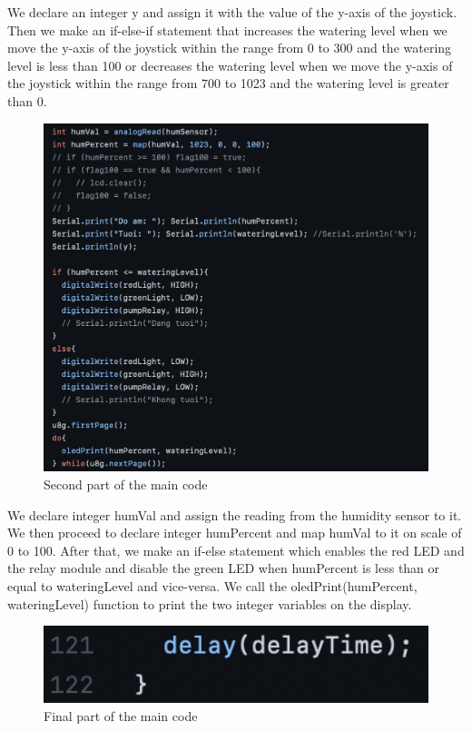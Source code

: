 \documentclass[12pt]{article}
\begin{document}
    We declare an integer y and assign it with the value of the y-axis of the joystick. Then we make an if-else-if statement that increases the watering level when we move the y-axis of the joystick within the range from 0 to 300 and the watering level is less than 100 or decreases the watering level when we move the y-axis of the joystick within the range from 700 to 1023 and the watering level is greater than 0.
    
    \begin{figure}[H]
        \centering
        \includegraphics[width=14cm]{./images/main2.png}
        \caption{Second part of the main code}
        \label{fig:main2}
    \end{figure}
    
    We declare integer humVal and assign the reading from the humidity sensor to it. We then proceed to declare integer humPercent and map humVal to it on scale of 0 to 100. After that, we make an if-else statement which enables the red LED and the relay module and disable the green LED when humPercent is less than or equal to wateringLevel and vice-versa. We call the oledPrint(humPercent, wateringLevel) function to print the two integer variables on the display.
    
    \begin{figure}[H]
        \centering
        \includegraphics[width=14cm]{./images/main3.png}
        \caption{Final part of the main code}
        \label{fig:main3}
    \end{figure}
    
\end{document}
